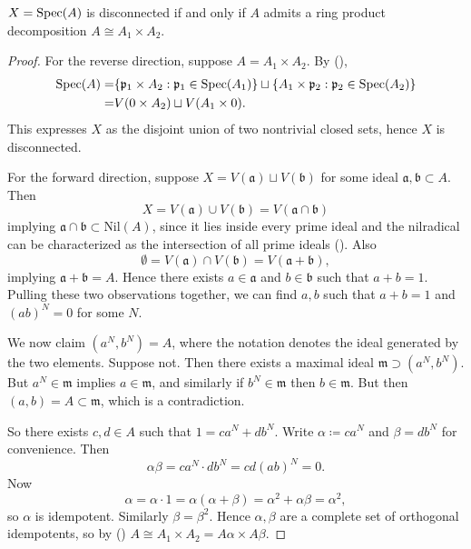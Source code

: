 \documentclass[12pt]{article}
\begin{document}
\begin{proposition}
	$X = \text{Spec}(A)$ is disconnected if and only if $A$ admits a ring product decomposition $A\cong A_1\times A_2$.
\end{proposition}
\begin{proof}
	For the reverse direction, suppose $A=A_1\times A_2$. By (), 
	\begin{align*}
		\text{Spec}(A) 
		=& \{\mathfrak{p}_1\times A_2 : \mathfrak{p}_1\in\text{Spec}(A_1)\} \sqcup \{A_1\times\mathfrak{p}_2 : \mathfrak{p}_2\in\text{Spec}(A_2)\} \\
		=& V(0\times A_2) \sqcup V(A_1\times 0).
	\end{align*}
	This expresses $X$ as the disjoint union of two nontrivial closed sets, hence $X$ is disconnected.

	For the forward direction, suppose $X=V(\mathfrak{a})\sqcup V(\mathfrak{b})$ for some ideal $\mathfrak{a},\mathfrak{b}\subset A$. Then 
	\begin{equation*}
		X = V(\mathfrak{a})\cup V(\mathfrak{b}) = V(\mathfrak{a}\cap\mathfrak{b})
	\end{equation*}
	implying $\mathfrak{a}\cap \mathfrak{b}\subset\text{Nil}(A)$, since it lies inside every prime ideal and the nilradical can be characterized as the intersection of all prime ideals (). Also 
	\begin{equation*}
		\emptyset = V(\mathfrak{a})\cap V(\mathfrak{b}) = V(\mathfrak{a}+\mathfrak{b}),
	\end{equation*}
	implying $\mathfrak{a}+\mathfrak{b}=A$. Hence there exists $a\in\mathfrak{a}$ and $b\in\mathfrak{b}$ such that $a+b=1$. Pulling these two observations together, we can find $a,b$ such that $a+b=1$ and $(ab)^N=0$ for some $N$.

	We now claim $(a^N,b^N)=A$, where the notation denotes the ideal generated by the two elements. Suppose not. Then there exists a maximal ideal $\mathfrak{m}\supset (a^N,b^N)$. But $a^N\in\mathfrak{m}$ implies $a\in\mathfrak{m}$, and similarly if $b^N\in\mathfrak{m}$ then $b\in\mathfrak{m}$. But then $(a,b)=A\subset\mathfrak{m}$, which is a contradiction.

	So there exists $c,d\in A$ such that $1=ca^N+db^N$. Write $\alpha\coloneqq ca^N$ and $\beta=db^N$ for convenience. Then 
	\begin{equation*}
		\alpha\beta = ca^N\cdot db^N = cd(ab)^N=0.
	\end{equation*}
	Now 
	\begin{equation*}
		\alpha = \alpha\cdot 1 = \alpha(\alpha+\beta) = \alpha^2 + \alpha\beta = \alpha^2,
	\end{equation*}
	so $\alpha$ is idempotent. Similarly $\beta=\beta^2$. Hence $\alpha,\beta$ are a complete set of orthogonal idempotents, so by () $A\cong A_1\times A_2=A\alpha\times A\beta$.
\end{proof}
\end{document}
